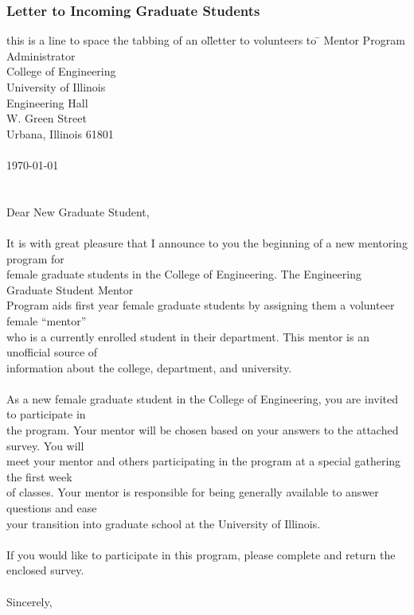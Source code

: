 \eject
\subsubsection{Letter to Incoming Graduate Students}
\label{newletter}
\begin{tabbing}
this is a line to space the tabbing of an ol\= letter to volunteers to \= \kill
\>\>Mentor Program Administrator  \\
\>\>College of Engineering\\
\>\>University of Illinois\\
\> Engineering Hall \\
\> W. Green Street \\
\>\>Urbana, Illinois  61801\\
\\
\>\>\today  \\
\\
\\
Dear New Graduate Student, \\
\\
It is with great pleasure that I announce to you the beginning of a new mentoring program for \\
female graduate students in the College of Engineering.  The Engineering Graduate Student Mentor \\
Program aids first year female graduate students by assigning them a volunteer female ``mentor''  \\
who is a currently enrolled student in their department.   This mentor is an unofficial source of \\
information about the college, department, and university. \\
 \\
As a new female graduate student in the College of Engineering, you are invited to participate in \\
the program.  Your mentor will be chosen based on your answers to the attached survey.  You will \\
meet your mentor and others participating in the program at a special gathering the first week \\
of classes.  Your mentor is responsible for being generally available to answer questions and ease \\
your transition into graduate school at the University of Illinois. \\
 \\
If you would like to participate in this program, please complete and return the enclosed survey.  \\
 \\
\> Sincerely,\\
\\
\\
\end{tabbing}

